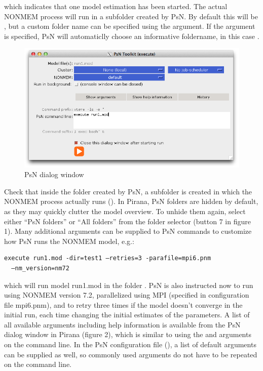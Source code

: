 \noindent which indicates that one model estimation has
been started. The actual NONMEM process will run in a subfolder
created by PsN. By default this will be , but a custom
folder name can be specified using the  argument. If the argument
is specified, PsN will automaticlly choose an
informative foldername, in this case . 

\begin{figure}[H] \centering
    \includegraphics[scale=0.4]{images/fig2_psn_execute.png}
    \caption{PsN dialog window}
\end{figure}

\noindent Check that inside the folder created by PsN, a subfolder is created in which the
NONMEM process actually runs (). In Pirana, PsN folders are
hidden by default, as they may quickly clutter the model overview. To
unhide them again, select either “PsN folders” or “All folders” from
the folder selector (button 7 in figure 1). Many additional arguments
can be supplied to PsN commands to customize how PsN runs the NONMEM
model, e.g.: 

\begin{lstlisting}
execute run1.mod -dir=test1 –retries=3 -parafile=mpi6.pnm 
  –nm_version=nm72
\end{lstlisting}

\noindent which will run model run1.mod in the folder . PsN is
also instructed now to run using NONMEM version 7.2, parallelized
using MPI (specified in configuration file mpi6.pnm), and to retry
three times if the model doesn’t converge in the initial run, each
time changing the initial estimates of the parameters. A list of all
available arguments including help information is available from the
PsN dialog window in Pirana (figure 2), which is similar to using the
 and  arguments on the command line. In the PsN configuration
file (), a list of default arguments can be supplied as well,
so commonly used arguments do not have to be repeated on the command
line.

